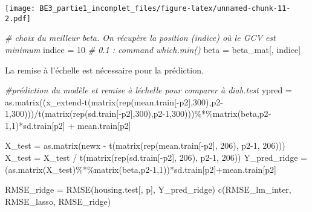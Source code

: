\documentclass[
]{article}
\newenvironment{Shaded}{\begin{snugshade}}{\end{snugshade}}
\newcommand{\CommentTok}[1]{\textcolor[rgb]{0.56,0.35,0.01}{\textit{#1}}}
\newcommand{\DecValTok}[1]{\textcolor[rgb]{0.00,0.00,0.81}{#1}}
\newcommand{\FunctionTok}[1]{\textcolor[rgb]{0.00,0.00,0.00}{#1}}
\newcommand{\NormalTok}[1]{#1}
\newcommand{\OtherTok}[1]{\textcolor[rgb]{0.56,0.35,0.01}{#1}}
\newcommand{\SpecialCharTok}[1]{\textcolor[rgb]{0.00,0.00,0.00}{#1}}
\begin{document}
\texttt{[image: BE3\_partie1\_incomplet\_files/figure-latex/unnamed-chunk-11-2.pdf]}

\begin{Shaded}
\begin{Highlighting}[]
\CommentTok{\# choix du meilleur beta. On récupère la position (indice) où le GCV est minimum}
\NormalTok{indice }\OtherTok{=} \DecValTok{10}  \CommentTok{\# 0.1 : command which.min()}
\NormalTok{beta }\OtherTok{=}\NormalTok{ beta\_mat[, indice]}
\end{Highlighting}
\end{Shaded}

La remise à l'échelle est nécessaire pour la prédiction.

\begin{Shaded}
\begin{Highlighting}[]
\CommentTok{\#prédiction du modèle et remise à l\textquotesingle{}échelle pour comparer à diab.test}
\NormalTok{ypred }\OtherTok{=}  \FunctionTok{as.matrix}\NormalTok{((x\_extend}\SpecialCharTok{{-}}\FunctionTok{t}\NormalTok{(}\FunctionTok{matrix}\NormalTok{(}\FunctionTok{rep}\NormalTok{(mean.train[}\SpecialCharTok{{-}}\NormalTok{p2],}\DecValTok{300}\NormalTok{),p2}\DecValTok{{-}1}\NormalTok{,}\DecValTok{300}\NormalTok{)))}\SpecialCharTok{/}\FunctionTok{t}\NormalTok{(}\FunctionTok{matrix}\NormalTok{(}\FunctionTok{rep}\NormalTok{(sd.train[}\SpecialCharTok{{-}}\NormalTok{p2],}\DecValTok{300}\NormalTok{),p2}\DecValTok{{-}1}\NormalTok{,}\DecValTok{300}\NormalTok{)))}\SpecialCharTok{\%*\%}\FunctionTok{matrix}\NormalTok{(beta,p2}\DecValTok{{-}1}\NormalTok{,}\DecValTok{1}\NormalTok{)}\SpecialCharTok{*}\NormalTok{sd.train[p2] }\SpecialCharTok{+}\NormalTok{ mean.train[p2]}

\NormalTok{X\_test }\OtherTok{=} \FunctionTok{as.matrix}\NormalTok{(newx }\SpecialCharTok{{-}} \FunctionTok{t}\NormalTok{(}\FunctionTok{matrix}\NormalTok{(}\FunctionTok{rep}\NormalTok{(mean.train[}\SpecialCharTok{{-}}\NormalTok{p2], }\DecValTok{206}\NormalTok{), p2}\DecValTok{{-}1}\NormalTok{, }\DecValTok{206}\NormalTok{)))}
\NormalTok{X\_test }\OtherTok{=}\NormalTok{ X\_test }\SpecialCharTok{/} \FunctionTok{t}\NormalTok{(}\FunctionTok{matrix}\NormalTok{(}\FunctionTok{rep}\NormalTok{(sd.train[}\SpecialCharTok{{-}}\NormalTok{p2], }\DecValTok{206}\NormalTok{), p2}\DecValTok{{-}1}\NormalTok{, }\DecValTok{206}\NormalTok{))}
\NormalTok{Y\_pred\_ridge }\OtherTok{=}\NormalTok{ (}\FunctionTok{as.matrix}\NormalTok{(X\_test)}\SpecialCharTok{\%*\%}\FunctionTok{matrix}\NormalTok{(beta,p2}\DecValTok{{-}1}\NormalTok{,}\DecValTok{1}\NormalTok{))}\SpecialCharTok{*}\NormalTok{sd.train[p2]}\SpecialCharTok{+}\NormalTok{mean.train[p2]}

\NormalTok{RMSE\_ridge }\OtherTok{=} \FunctionTok{RMSE}\NormalTok{(housing.test[, p], Y\_pred\_ridge)}
\FunctionTok{c}\NormalTok{(RMSE\_lm\_inter, RMSE\_lasso, RMSE\_ridge)}
\end{Highlighting}
\end{Shaded}
\end{document}
